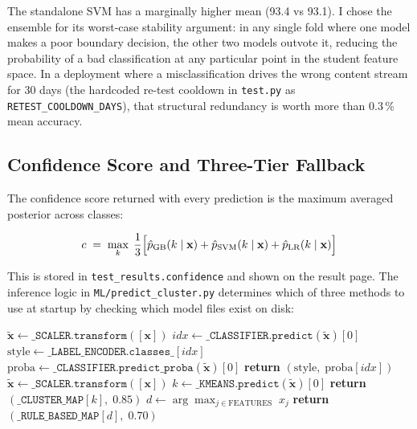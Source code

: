 \documentclass[12pt,a4paper]{article}
\begin{document}
The standalone SVM has a marginally higher mean (93.4 vs 93.1).
I chose the ensemble for its worst-case stability argument: in any
single fold where one model makes a poor boundary decision, the
other two models outvote it, reducing the probability of a bad
classification at any particular point in the student feature
space. In a deployment where a misclassification drives the wrong
content stream for 30 days (the hardcoded re-test cooldown in
\texttt{test.py} as \texttt{RETEST\_COOLDOWN\_DAYS}), that
structural redundancy is worth more than 0.3\,\% mean accuracy.

\subsection{Confidence Score and Three-Tier Fallback}

The confidence score returned with every prediction is the maximum
averaged posterior across classes:

\begin{equation}
  c \;=\; \max_{k}\;\frac{1}{3}\Bigl[
    \hat{p}_{\text{GB}}(k \mid \mathbf{x})
  + \hat{p}_{\text{SVM}}(k \mid \mathbf{x})
  + \hat{p}_{\text{LR}}(k \mid \mathbf{x})
  \Bigr]
\end{equation}

This is stored in \texttt{test\_results.confidence} and shown on
the result page. The inference logic in
\texttt{ML/predict\_cluster.py} determines which of three methods
to use at startup by checking which model files exist on disk:

\begin{algorithm}[H]
\caption{Three-Tier Prediction in \texttt{predict\_learning\_style()}}
\begin{algorithmic}[1]
  \State $\tilde{\mathbf{x}} \leftarrow
         \texttt{\_SCALER.transform}([\mathbf{x}])$
  \State $idx \leftarrow \texttt{\_CLASSIFIER.predict}(\tilde{\mathbf{x}})[0]$
  \State $\text{style} \leftarrow \texttt{\_LABEL\_ENCODER.classes\_}[idx]$
  \State $\text{proba} \leftarrow \texttt{\_CLASSIFIER.predict\_proba}(\tilde{\mathbf{x}})[0]$
  \State \textbf{return} $(\text{style},\; \text{proba}[idx])$
  \State $\tilde{\mathbf{x}} \leftarrow
         \texttt{\_SCALER.transform}([\mathbf{x}])$
  \State $k \leftarrow \texttt{\_KMEANS.predict}(\tilde{\mathbf{x}})[0]$
  \State \textbf{return} $(\texttt{\_CLUSTER\_MAP}[k],\; 0.85)$
\Else
  \State $d \leftarrow \arg\max_{j \in \text{FEATURES}}\; x_j$
  \State \textbf{return} $(\texttt{\_RULE\_BASED\_MAP}[d],\; 0.70)$
\EndIf
\end{algorithmic}
\end{algorithm}
\end{document}
